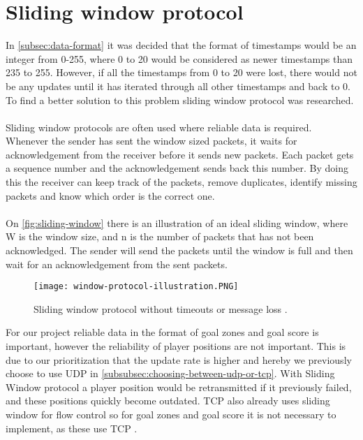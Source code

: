 \section{Sliding window protocol}
In \autoref{subsec:data-format} it was decided that the format of timestamps would be an integer from 0-255, where 0 to 20 would be considered as newer timestamps than 235 to 255.
However, if all the timestamps from 0 to 20 were lost, there would not be any updates until it has iterated through all other timestamps and back to 0.
To find a better solution to this problem sliding window protocol was researched.
\\\\
Sliding window protocols are often used where reliable data is required.
Whenever the sender has sent the window sized packets, it waits for acknowledgement from the receiver before it sends new packets.
Each packet gets a sequence number and the acknowledgement sends back this number.
By doing this the receiver can keep track of the packets, remove duplicates, identify missing packets and know which order is the correct one.
\\\\
On \autoref{fig:sliding-window} there is an illustration of an ideal sliding window, where W is the window size, and n is the number of packets that has not been acknowledged.
The sender will send the packets until the window is full and then wait for an acknowledgement from the sent packets.
\begin{figure}[H]
    \centering
    \texttt{[image: window-protocol-illustration.PNG]}
    \caption{Sliding window protocol without timeouts or message loss \cite{design-and-validation-of-computer-protocols}.}
    \label{fig:sliding-window}
\end{figure}
\noindent
For our project reliable data in the format of goal zones and goal score is important, however the reliability of player positions are not important.
This is due to our prioritization that the update rate is higher and hereby we previously choose to use UDP in \autoref{subsubsec:choosing-between-udp-or-tcp}.
With Sliding Window protocol a player position would be retransmitted if it previously failed, and these positions quickly become outdated.
TCP also already uses sliding window for flow control so for goal zones and goal score it is not necessary to implement, as these use TCP \cite{ibm:sliding-window}.
